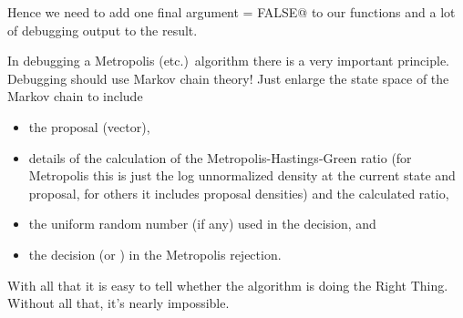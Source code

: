 \documentclass{article}
\begin{document}
Hence we need to add one final argument \verb@debug = FALSE@ to our
functions and a lot of debugging output to the result.

In debugging a Metropolis (etc.)\ algorithm there is a very important
principle.  Debugging should use Markov chain theory!  Just enlarge
the state space of the Markov chain to include
\begin{itemize}
\item the proposal (vector),
\item details of the calculation of the Metropolis-Hastings-Green ratio
    (for Metropolis this is just the log unnormalized density at the
    current state and proposal, for others it includes proposal densities)
    and the calculated ratio,
\item the uniform random number (if any) used in the decision, and
\item the decision (\verb@TRUE@ or \verb@FALSE@) in the Metropolis rejection.
\end{itemize}
With all that it is easy to tell whether the algorithm is doing the Right
Thing.  Without all that, it's nearly impossible.
\end{document}
